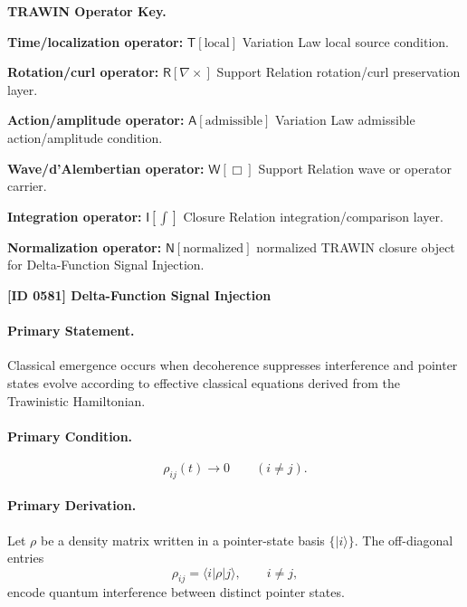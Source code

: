 \par\vspace{0.45\baselineskip}
\noindent\begin{minipage}[t]{\linewidth}
\begingroup
\small
\raggedright
\textbf{TRAWIN Operator Key.}\par
\noindent\textbf{Time/localization operator:} $\mathsf{T}\!\left[\mathrm{local}\right]$ Variation Law local source condition.\par
\noindent\textbf{Rotation/curl operator:} $\mathsf{R}\!\left[\nabla\times\right]$ Support Relation rotation/curl preservation layer.\par
\noindent\textbf{Action/amplitude operator:} $\mathsf{A}\!\left[\mathrm{admissible}\right]$ Variation Law admissible action/amplitude condition.\par
\noindent\textbf{Wave/d'Alembertian operator:} $\mathsf{W}\!\left[\Box\right]$ Support Relation wave or operator carrier.\par
\noindent\textbf{Integration operator:} $\mathsf{I}\!\left[\int\right]$ Closure Relation integration/comparison layer.\par
\noindent\textbf{Normalization operator:} $\mathsf{N}\!\left[\mathrm{normalized}\right]$ normalized TRAWIN closure object for Delta-Function Signal Injection.\par
\endgroup
\end{minipage}

\clearpage
\noindent\textbf{[ID 0581] Delta-Function Signal Injection}\par
\vspace{0.35em}
\paragraph{Primary Statement.}
Classical emergence occurs when decoherence suppresses interference and pointer states evolve according to effective classical equations derived from the Trawinistic Hamiltonian.

\paragraph{Primary Condition.}
\begin{equation}
\rho_{ij}(t)\rightarrow 0
\qquad
(i\neq j).
\end{equation}

\paragraph{Primary Derivation.}
Let $\rho$ be a density matrix written in a pointer-state basis $\{|i\rangle\}$.  
The off-diagonal entries
\begin{equation}
\rho_{ij}
=
\langle i|\rho|j\rangle,
\qquad i\neq j,
\end{equation}
encode quantum interference between distinct pointer states.

